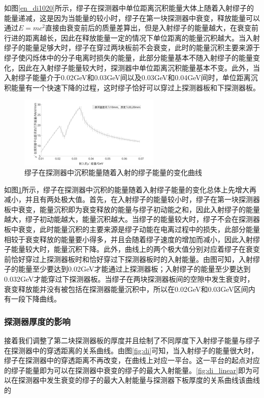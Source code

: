 \documentclass[aps,prd,superscriptaddress,nofootinbib,preprint]{ctexart}
\begin{document}
\begin{CJK}{UTF8}{gbsn}
如图\ref{en_di1020}所示，缪子在探测器中单位距离沉积能量大体上随着入射缪子的能量递减，这是因为当能量的较小时，缪子在第一块探测器中衰变，释放能量可以通过$E=mc^2$直接由衰变前后的质量差算出，但是入射缪子的能量越大，在衰变前行进的距离越长，因此在释放能量一定的情况下单位距离的能量沉积越大。当入射缪子的能量足够大时，缪子在穿过两块板前不会衰变，此时的能量沉积主要来源于缪子使闪烁体中的分子电离时损失的能量，此部分能量基本不随入射缪子的能量变化，因此在入射缪子能量较大时，探测器中单位距离沉积能量基本不变。此外，当入射缪子能量介于0.02GeV和0.03GeV间以及0.03GeV和0.04GeV间时，单位距离沉积能量有一个快速下降的过程，这时缪子恰好可以穿过上探测器板和下探测器板。\\

\begin{figure}[H]
    \centering\includegraphics[width=0.6\textwidth]{pic/de_en_dis_10_se_20.jpg}
    \caption{缪子在探测器中沉积能量随着入射的缪子能量的变化曲线}\label{en1020}
\end{figure}

如图\ref{en1020}所示，缪子在探测器中沉积的能量随着入射缪子能量的变化总体上先增大再减小，并且有两处极大值。首先，在入射缪子的能量较小时，缪子在第一块探测器板中衰变，能量沉积即为衰变释放的能量与缪子初动能之和，因此入射缪子的能量越大，缪子初动能越大，能量沉积越大。当缪子的能量较大时，缪子不会在探测器板中衰变，此时能量沉积的主要来源是缪子动能在电离过程中的损失，此部分能量相较于衰变释放的能量要小得多，并且会随着缪子速度的增加而减小，因此入射缪子能量较大时，能量沉积下降。此外，曲线上的两个极大值分别对应着缪子在衰变前恰好穿过上探测器板时和恰好穿过下探测器板时的入射能量。由图可知，入射缪子的能量至少要达到0.02GeV才能通过上探测器板；入射缪子的能量至少要达到0.032GeV才能穿过下探测器板。当缪子在两块探测器板间的空隙中发生衰变时，衰变释放能并没有被包括在探测器能量沉积中，所以在0.02GeV和0.03GeV区间内有一段下降曲线。

\subsubsection{探测器厚度的影响}
接着我们调整了第二块探测器板的厚度并且绘制了不同厚度下入射缪子能量与缪子在探测器中的穿透距离的关系曲线。由图\ref{fig:di}可知，当入射缪子的能量很大时，缪子在探测器中的穿透距离不再改变，在曲线上对应一平台。这一平台的起点对应的缪子能量即为可以在探测器中衰变的缪子的最大入射能量。\ref{fig:di_linear}即为可以在探测器中发生衰变的缪子的最大入射能量与探测器下板厚度的关系曲线该曲线的\\



\end{CJK}
\end{document}
